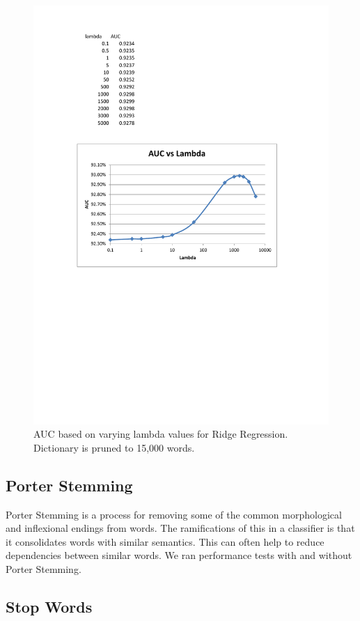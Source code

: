 \documentclass{article}
\begin{document}
\begin{figure}[h]
	\centering
	\includegraphics[width=\linewidth]{files/lambda.pdf}
	\caption{AUC based on varying lambda values for Ridge Regression. Dictionary is pruned to 15,000 words.}
	\label{fig:lambda}
\end{figure}

\subsection{Porter Stemming}
Porter Stemming is a process for removing some of the common morphological and inflexional endings from words. The ramifications of this in a classifier is that it consolidates words with similar semantics. This can often help to reduce dependencies between similar words. We ran performance tests with and without Porter Stemming. 

\subsection{Stop Words}
\end{document}
